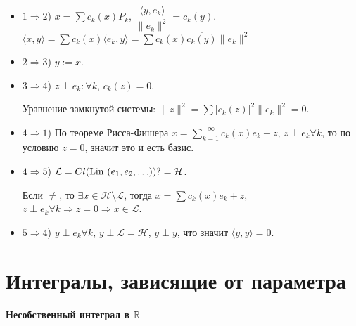 \documentclass{article}
\begin{document}
            \begin{itemize}
            
                \item $1 \Rightarrow 2$) $x = \sum c_k(x) P_k$, $\dfrac{\langle y, e_k \rangle}{\| e_k \|^2} = c_k(y)$. $\langle x, y \rangle = \sum c_k(x) \langle e_k, y \rangle = \sum c_k(x) \overline{c_k(y)} \| e_k \|^2$
                
                \item $2 \Rightarrow 3$) $y := x$.
                
                \item $3 \Rightarrow 4$) $z \perp e_k : \forall k$, $c_k(z) = 0$.
                
                    Уравнение замкнутой системы: $\| z \|^2 = \sum \left| c_k(z) \right|^2 \| e_k \|^2 = 0$.

                \item $4 \Rightarrow 1$) По теореме Рисса-Фишера $x = \sum\limits_{k = 1}^{+\infty} c_k(x) e_k + z$, $z \perp e_k \forall k$, то по условию $z = 0$, значит это и есть базис.
                
                \item $4 \Rightarrow 5$) $\mathcal{L} = Cl ( \Lin ( e_1, e_2, \ldots )) ?= \mathcal{H}$.
                    
                    Если $\neq$, то $\exists x \in \mathcal{H} \setminus \mathcal{L}$, тогда $x = \sum c_k(x) e_k + z$, $z \perp e_k \forall k \Rightarrow z = 0 \Rightarrow x \in \mathcal{L}$.
                    
                \item $5 \Rightarrow 4$) $y \perp e_k \forall k$, $y \perp \mathcal{L} = \mathcal{H}$, $y \perp y$, что значит $\langle y, y \rangle = 0$.
                
            \end{itemize}
        
\newpage

\part{Интегралы, зависящие от параметра}

\newpage

    \subsection{Несобственный интеграл в $\mathbb{R}$}
    
\end{document}

